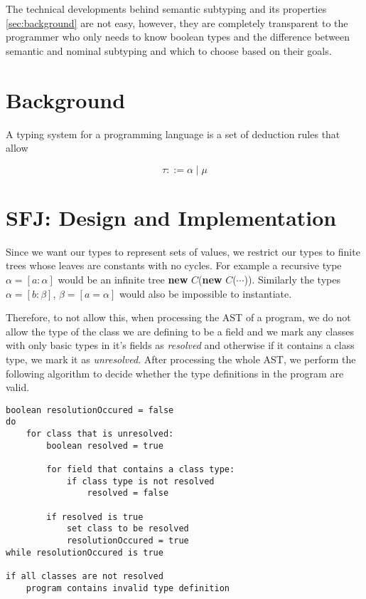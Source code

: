 \documentclass[runningheads]{llncs}
\begin{document}
The technical developments behind semantic subtyping and its properties \autoref{sec:background} are not easy, however, they are completely transparent to the programmer who only needs to know boolean types and the difference between semantic and nominal subtyping and which to choose based on their goals. 


\section{Background}
\label{sec:background}


A typing system for a programming language is a set of deduction rules that allow 

\begin{equation}
    \tau ::= \alpha \mid \mu
\end{equation}

\section{SFJ: Design and Implementation}
\label{sec:design}
Since we want our types to represent sets of values, we restrict our types to finite trees whose 
leaves are constants with no cycles. For example a recursive type $\alpha = [a : \alpha]$ would
be an infinite tree \textbf{new} $C$(\textbf{new} $C$($\cdots{}$)). Similarly the types $\alpha = 
[b: \beta]$, $\beta = [a = \alpha]$ would also be impossible to instantiate. 

Therefore, to not allow this, when processing the AST of a program, we do not allow the type of 
the class we are defining to be a field and we mark any classes with only basic types in it's fields
as \textit{resolved} and otherwise if it contains a class type, we mark it as \textit{unresolved}. 
After processing the whole AST, we perform the following algorithm to decide whether the type 
definitions in the program are valid.

\begin{verbatim}
boolean resolutionOccured = false
do 
    for class that is unresolved:
        boolean resolved = true

        for field that contains a class type:
            if class type is not resolved 
                resolved = false
        
        if resolved is true
            set class to be resolved
            resolutionOccured = true
while resolutionOccured is true

if all classes are not resolved
    program contains invalid type definition
\end{verbatim}
\end{document}
